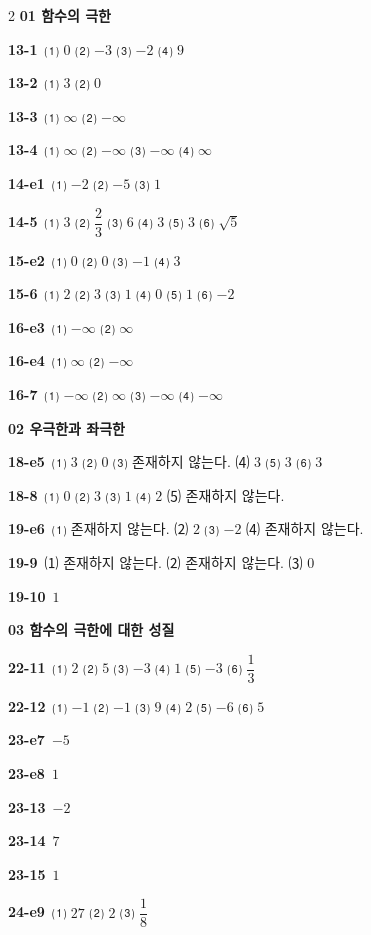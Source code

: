 \documentclass[10pt,a4paper]{article}
\begin{document}
\begin{multicols}{2}\small
\noindent\textbf{01 함수의 극한}\par\smallskip
\noindent\textbf{13-1}\ ⑴ $0$ ⑵ $-3$ ⑶ $-2$ ⑷ $9$\par
\noindent\textbf{13-2}\ ⑴ $3$ ⑵ $0$\par
\noindent\textbf{13-3}\ ⑴ $\infty$ ⑵ $-\infty$\par
\noindent\textbf{13-4}\ ⑴ $\infty$ ⑵ $-\infty$ ⑶ $-\infty$ ⑷ $\infty$\par
\noindent\textbf{14-e1}\ ⑴ $-2$ ⑵ $-5$ ⑶ $1$\par
\noindent\textbf{14-5}\ ⑴ $3$ ⑵ $\dfrac{2}{3}$ ⑶ $6$ ⑷ $3$ ⑸ $3$ ⑹ $\sqrt{5}$\par
\noindent\textbf{15-e2}\ ⑴ $0$ ⑵ $0$ ⑶ $-1$ ⑷ $3$\par
\noindent\textbf{15-6}\ ⑴ $2$ ⑵ $3$ ⑶ $1$ ⑷ $0$ ⑸ $1$ ⑹ $-2$\par
\noindent\textbf{16-e3}\ ⑴ $-\infty$ ⑵ $\infty$\par
\noindent\textbf{16-e4}\ ⑴ $\infty$ ⑵ $-\infty$\par
\noindent\textbf{16-7}\ ⑴ $-\infty$ ⑵ $\infty$ ⑶ $-\infty$ ⑷ $-\infty$\par
\noindent\textbf{02 우극한과 좌극한}\par\smallskip
\noindent\textbf{18-e5}\ ⑴ $3$ ⑵ $0$ ⑶ 존재하지 않는다. ⑷ $3$ ⑸ $3$ ⑹ $3$\par
\noindent\textbf{18-8}\ ⑴ $0$ ⑵ $3$ ⑶ $1$ ⑷ $2$ ⑸ 존재하지 않는다.\par
\noindent\textbf{19-e6}\ ⑴ 존재하지 않는다. ⑵ $2$ ⑶ $-2$ ⑷ 존재하지 않는다.\par
\noindent\textbf{19-9}\ ⑴ 존재하지 않는다. ⑵ 존재하지 않는다. ⑶ $0$\par
\noindent\textbf{19-10}\ $1$\par
\noindent\textbf{03 함수의 극한에 대한 성질}\par\smallskip
\noindent\textbf{22-11}\ ⑴ $2$ ⑵ $5$ ⑶ $-3$ ⑷ $1$ ⑸ $-3$ ⑹ $\dfrac{1}{3}$\par
\noindent\textbf{22-12}\ ⑴ $-1$ ⑵ $-1$ ⑶ $9$ ⑷ $2$ ⑸ $-6$ ⑹ $5$\par
\noindent\textbf{23-e7}\ $-5$\par
\noindent\textbf{23-e8}\ $1$\par
\noindent\textbf{23-13}\ $-2$\par
\noindent\textbf{23-14}\ $7$\par
\noindent\textbf{23-15}\ $1$\par
\noindent\textbf{24-e9}\ ⑴ $27$ ⑵ $2$ ⑶ $\dfrac{1}{8}$\par

\end{multicols}
\end{document}
